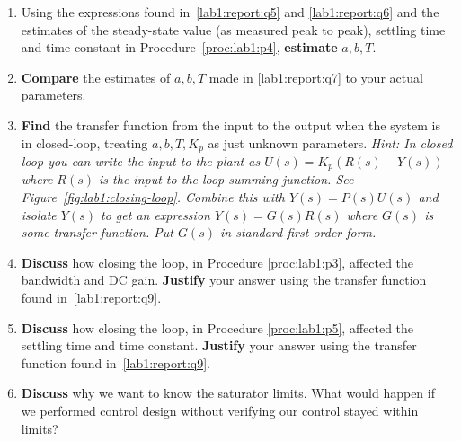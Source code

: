 \begin{deliverable}[label={lab1:report}]
\begin{enumerate}[label={(\arabic*)}]
{    }
    \item{
      \label{lab1:report:q7}
      Using the expressions found in~\ref{lab1:report:q5} and
      \ref{lab1:report:q6} and the estimates of the steady-state value (as measured peak to peak), settling time and time constant in Procedure~\ref{proc:lab1:p4},
      \textbf{estimate} \(a, b, T.\)
    }
    \item{
      \label{lab1:report:q8}
      \textbf{Compare} the estimates of \(a, b, T\) made in
      \ref{lab1:report:q7} to your actual parameters.
    }
    \item{
      \label{lab1:report:q9}
      \textbf{Find} the transfer
      function from the input to the output when the system is in
      closed-loop, treating \(a, b, T, K_p\) as just unknown parameters.
      \emph{Hint: In closed loop you can write the input to the plant as
      \(U(s) = K_p(R(s) - Y(s))\)
      where \(R(s)\) is the input to the loop summing junction. See
      Figure~\ref{fig:lab1:closing-loop}. Combine this with \(Y(s) = P(s)U(s)\)
      and isolate \(Y(s)\) to get an expression \(Y(s) = G(s) R(s)\) where
      \(G(s)\) is some transfer function. Put \(G(s)\) in standard first order form.}
    }
    \item{
      \label{lab1:report:q10}
      \textbf{Discuss} how closing the loop, in Procedure
      \ref{proc:lab1:p3}, affected the bandwidth and DC gain.
      \textbf{Justify} your answer using the transfer function
      found in~\ref{lab1:report:q9}.
    }
    \item{
      \label{lab1:report:q11}
      \textbf{Discuss} how closing the loop, in Procedure
      \ref{proc:lab1:p5}, affected the settling time and time constant.
      \textbf{Justify} your answer using the transfer function
      found in~\ref{lab1:report:q9}.
    }
    \item{
      \label{lab1:report:q12}
      \textbf{Discuss} why we want to know the saturator limits. What would
      happen if we performed control design without verifying our control
      stayed within limits?
    }
  \end{enumerate}
\end{deliverable}

